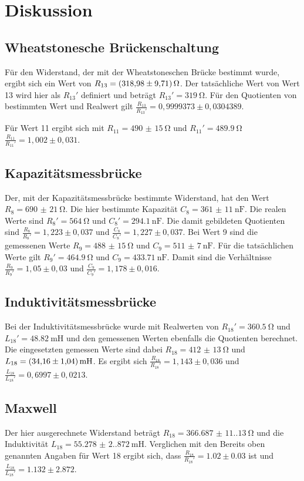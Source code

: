 \section{Diskussion}
    \subsection{Wheatstonesche Brückenschaltung}
    Für den Widerstand, der mit der Wheatstoneschen Brücke bestimmt wurde, ergibt sich ein Wert von $R_{13}=\qty{318,98(9,71)}{\ohm}$.
    Der tatsächliche Wert von Wert 13 wird hier als $R_{13}'$ definiert und beträgt $R_{13}'=\qty{319}{\ohm}$.
    Für den Quotienten von bestimmten Wert und Realwert gilt $\frac{R_{13}}{R_{13}'}=0,9999373\pm0,0304389$.

    Für Wert 11 ergibt sich mit $R_{11}=\qty{490(15)}{\ohm}$ und $R_{11}'=\qty{489,9}{\ohm}$ $\frac{R_{11}}{R_11'}=1,002\pm0,031$.

    \subsection{Kapazitätsmessbrücke}
    Der, mit der Kapazitätsmessbrücke bestimmte Widerstand, hat den Wert $R_8=\qty{690(21)}{\ohm}$.
    Die hier bestimmte Kapazität $C_8=\qty{361(11)}{\nano\farad}$. 
    Die realen Werte sind $R_8'=\qty{564}{\ohm}$ und $C_8'=\qty{294,1}{\nano\farad}$.
    Die damit gebildeten Quotienten sind $\frac{R_8}{R_8'}=1,223\pm0,037$ und $\frac{C_8}{C_8'}=1,227\pm0,037$.
    Bei Wert 9 sind die gemessenen Werte $R_9=\qty{488(15)}{\ohm}$ und $C_9=\qty{511(7)}{\nano\farad}$.
    Für die tatsächlichen Werte gilt $R_9'=\qty{464,9}{\ohm}$ und $C_9=\qty{433,71}{\nano\farad}$.
    Damit sind die Verhältnisse $\frac{R_9}{R_9'}=1,05\pm0,03$ und $\frac{C_9}{C_9'}=1,178\pm0,016$.
    
    \subsection{Induktivitätsmessbrücke}
    Bei der Induktivitätsmessbrücke wurde mit Realwerten von $R_{18}'=\qty{360,5}{\ohm}$ und $L_{18}'=\qty{48,82}{\milli\henry}$ und den gemessenen Werten ebenfalls die Quotienten berechnet.
    Die eingesetzten gemessen Werte sind dabei $R_{18}=\qty{412(13)}{\ohm}$ und $L_{18}=\qty{34,16(1,04)}{\milli\henry}$.
    Es ergibt sich $\frac{R_{18}}{R_{18}'}=1,143\pm0,036$ und $\frac{L_{18}}{L_{18}'}=0,6997\pm0,0213$.

    \subsection{Maxwell}
    Der hier ausgerechnete Widerstand beträgt $R_18=\qty{366.687(11.130)}{\ohm}$ und die Induktivität $L_18=\qty{55.278(2.872)}{\milli\henry}$.
    Verglichen mit den Bereits oben genannten Angaben für Wert 18 ergibt sich, dass $\frac{R_18}{R_18'}=1.02\pm0.03$ ist und
    $\frac{L_{18}}{L_{18}'}=1.132\pm2.872$.

